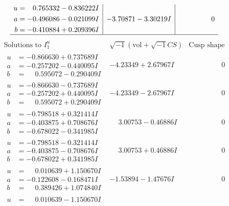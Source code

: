 \documentclass[1p]{elsarticle_modified}
\theoremstyle{definition}
\newcommand{\I}{\sqrt{-1}}
\begin{document}
$$\begin{array}{c|c|c}
\begin{aligned}
u &= \phantom{-}0.765332 - 0.836222 I \\
a &= -0.496086 - 0.021099 I \\
b &= -0.410884 + 0.209396 I\end{aligned}
 & -3.70871 - 3.30219 I & \phantom{-0.000000 } 0\\
 \hline 
 \end{array}$$\newpage$$\begin{array}{c|c|c}  
\text{Solutions to }I^u_{1}& \I (\text{vol} + \sqrt{-1}CS) & \text{Cusp shape}\\
 \hline 
\begin{aligned}
u &= -0.866630 + 0.737689 I \\
a &= -0.257202 - 0.440095 I \\
b &= \phantom{-}0.595072 - 0.290409 I\end{aligned}
 & -4.23349 + 2.67967 I & \phantom{-0.000000 } 0 \\ \hline\begin{aligned}
u &= -0.866630 - 0.737689 I \\
a &= -0.257202 + 0.440095 I \\
b &= \phantom{-}0.595072 + 0.290409 I\end{aligned}
 & -4.23349 - 2.67967 I & \phantom{-0.000000 } 0 \\ \hline\begin{aligned}
u &= -0.798518 + 0.321414 I \\
a &= -0.403875 + 0.708676 I \\
b &= -0.678022 - 0.341985 I\end{aligned}
 & \phantom{-}3.00753 - 0.46886 I & \phantom{-0.000000 } 0 \\ \hline\begin{aligned}
u &= -0.798518 - 0.321414 I \\
a &= -0.403875 - 0.708676 I \\
b &= -0.678022 + 0.341985 I\end{aligned}
 & \phantom{-}3.00753 + 0.46886 I & \phantom{-0.000000 } 0 \\ \hline\begin{aligned}
u &= \phantom{-}0.010639 + 1.150670 I \\
a &= -0.122608 - 0.168471 I \\
b &= \phantom{-}0.389426 + 1.074840 I\end{aligned}
 & -1.53894 - 1.47676 I & \phantom{-0.000000 } 0 \\ \hline\begin{aligned}
u &= \phantom{-}0.010639 - 1.150670 I \\

\end{aligned}
\end{array}$$
\end{document}

